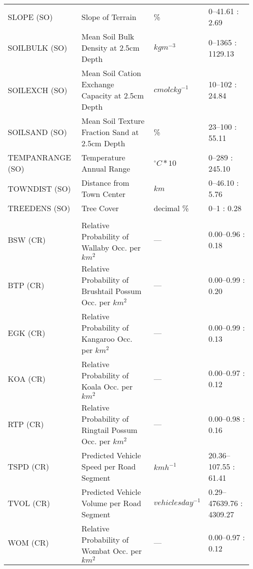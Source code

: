 \begin{table}[!t]
\begin{tabularx}{0.9\textwidth}{@{}lYll@{}}
SLOPE (SO)      &Slope of Terrain                                         &\%             &0--41.61 : 2.69\\
SOILBULK (SO)   &Mean Soil Bulk Density at 2.5cm Depth                    &$kg m^{-3}$    &0--1365 : 1129.13\\
SOILEXCH (SO)   &Mean Soil Cation Exchange Capacity at 2.5cm Depth        &$cmolc kg^{-1}$     &10--102 : 24.84\\
SOILSAND (SO)   &Mean Soil Texture Fraction Sand at 2.5cm Depth           &\%             &23--100 : 55.11\\
TEMPANRANGE (SO)&Temperature Annual Range                                 &$^{\circ}C*10$ &0--289 : 245.10\\
TOWNDIST (SO)   &Distance from Town Center                                &$km$           &0--46.10 : 5.76\\
TREEDENS (SO)   &Tree Cover                                               &decimal \%     &0--1 : 0.28\\
&&&\\
BSW (CR)        &Relative Probability of Wallaby Occ. per $km^2$          &---            &0.00--0.96 : 0.18\\
BTP (CR)        &Relative Probability of Brushtail Possum Occ. per $km^2$ &---            &0.00--0.99 : 0.20\\
EGK (CR)        &Relative Probability of Kangaroo Occ. per $km^2$         &---            &0.00--0.99 : 0.13\\
KOA (CR)        &Relative Probability of Koala Occ. per $km^2$            &---            &0.00--0.97 : 0.12\\
RTP (CR)        &Relative Probability of Ringtail Possum Occ. per $km^2$  &---            &0.00--0.98 : 0.16\\
TSPD (CR)       &Predicted Vehicle Speed per Road Segment                 &$km h^{-1}$    &20.36--107.55 : 61.41\\
TVOL (CR)       &Predicted Vehicle Volume per Road Segment                &$vehicles day^{-1}$ &0.29--47639.76 : 4309.27\\
WOM (CR)        &Relative Probability of Wombat Occ. per $km^2$           &---            &0.00--0.97 : 0.12\\
\bottomrule
\end{tabularx}
\label{6sp_variables}
\end{table}

